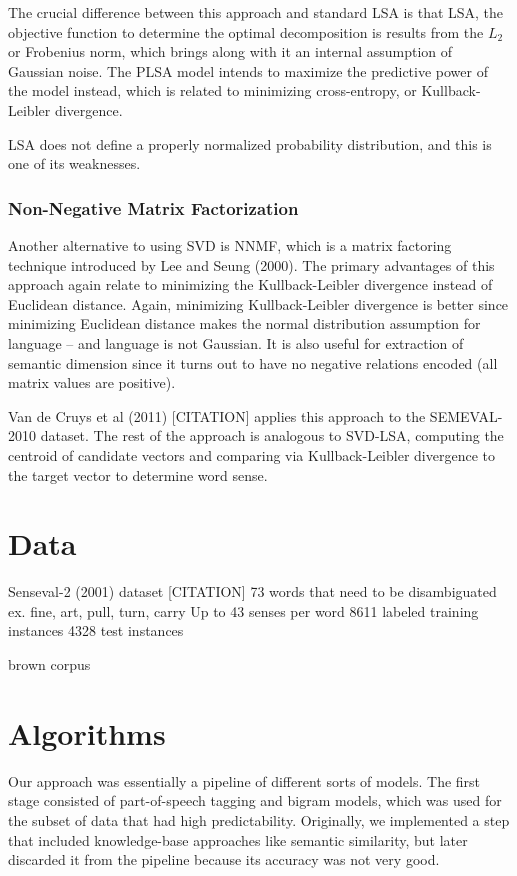 \documentclass[10pt, letterpaper]{article}
\begin{document}
	The crucial difference between this approach and standard LSA is that LSA, the objective function to determine the optimal decomposition is results from the $L_2$ or Frobenius norm, which brings along with it an internal assumption of Gaussian noise. The PLSA model intends to maximize the predictive power of the model instead, which is related to minimizing cross-entropy, or Kullback-Leibler divergence. 

	LSA does not define a properly normalized probability distribution, and this is one of its weaknesses.

	\subsubsection{Non-Negative Matrix Factorization}
	Another alternative to using SVD is NNMF, which is a matrix factoring technique introduced by Lee and Seung  (2000). 
	The primary advantages of this approach again relate to minimizing the Kullback-Leibler divergence instead of Euclidean distance. 
	Again, minimizing Kullback-Leibler divergence is better since minimizing Euclidean distance makes the normal distribution assumption for language -- and language is not Gaussian.
	It is also useful for extraction of semantic dimension since it turns out to have no negative relations encoded (all matrix values are positive). 

	Van de Cruys et al (2011) [CITATION] applies this approach to the SEMEVAL-2010 dataset. The rest of the approach is analogous to SVD-LSA, computing the centroid  of candidate vectors and comparing via Kullback-Leibler divergence to the target vector to determine word sense. 

	\section{Data}
	Senseval-2 (2001) dataset [CITATION]
	73 words that need to be disambiguated
	         ex. fine, art, pull, turn, carry
	Up to 43 senses per word
	8611 labeled training instances
	4328 test instances	

	brown corpus

	\section{Algorithms}
	 Our approach was essentially a pipeline of different sorts of models. 
	 The first stage consisted of part-of-speech tagging and bigram models, which
	 was used for the subset of data that had high predictability. 
	 Originally, we implemented a step that included knowledge-base approaches like
	 semantic similarity, but later discarded it from the pipeline because its accuracy
	 was not very good. 
\end{document}
